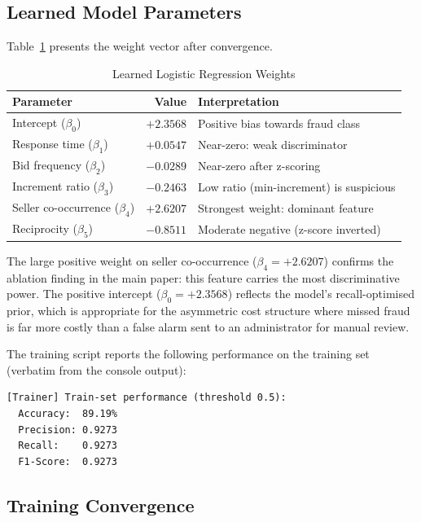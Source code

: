\documentclass[11pt]{article}
\begin{document}
\subsection{Learned Model Parameters}

Table~\ref{tab:weights} presents the weight vector after convergence.

\begin{table}[ht]
\centering
\caption{Learned Logistic Regression Weights}
\label{tab:weights}
\begin{tabular}{lrl}
\toprule
\textbf{Parameter} & \textbf{Value} & \textbf{Interpretation} \\
\midrule
Intercept ($\beta_0$) & $+2.3568$ & Positive bias towards fraud class \\
Response time ($\beta_1$) & $+0.0547$ & Near-zero: weak discriminator \\
Bid frequency ($\beta_2$) & $-0.0289$ & Near-zero after z-scoring \\
Increment ratio ($\beta_3$) & $-0.2463$ & Low ratio (min-increment) is suspicious \\
Seller co-occurrence ($\beta_4$) & $+2.6207$ & Strongest weight: dominant feature \\
Reciprocity ($\beta_5$) & $-0.8511$ & Moderate negative (z-score inverted) \\
\bottomrule
\end{tabular}
\end{table}

The large positive weight on seller co-occurrence ($\beta_4 = +2.6207$)
confirms the ablation finding in the main paper: this feature carries the
most discriminative power. The positive intercept ($\beta_0 = +2.3568$)
reflects the model's recall-optimised prior, which is appropriate for
the asymmetric cost structure where missed fraud is far more costly than
a false alarm sent to an administrator for manual review.

The training script reports the following performance on the training set
(verbatim from the console output):

\begin{lstlisting}[language={},caption={Training performance (verbatim from train.ts).}]
[Trainer] Train-set performance (threshold 0.5):
  Accuracy:  89.19%
  Precision: 0.9273
  Recall:    0.9273
  F1-Score:  0.9273
\end{lstlisting}

\subsection{Training Convergence}
\end{document}
